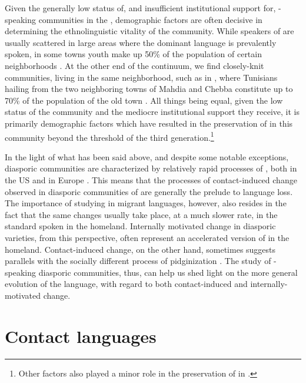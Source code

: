\documentclass[output=paper]{langsci/langscibook}
\begin{document}
Given the generally low status of, and insufficient institutional support for, -speaking communities in the , demographic factors are often decisive in determining the ethnolinguistic vitality of the community. While speakers of  are usually scattered in large areas where the dominant language is prevalently spoken, in some  towns  youth make up 50\% of the population of certain neighborhoods \citep[50]{Boumans2004}. At the other end of the continuum, we find closely-knit communities, living in the same neighborhood, such as in , where Tunisians hailing from the two neighboring towns of Mahdia and Chebba constitute up to 70\% of the population of the old town \citep[27]{Danna2017book}. All things being equal, given the low status of the  community and the mediocre institutional support they receive, it is primarily demographic factors which have resulted in the preservation of  in this community beyond the threshold of the third generation.\footnote{Other factors also played a minor role in the preservation of  in  \citep[80--81]{Danna2017book}.}

In the light of what has been said above, and despite some notable exceptions,  diasporic communities are characterized by relatively rapid processes of , both in the US \citep[29]{Daher1992} and in Europe \citep[282]{BoumansdeRuiter2002}. This means that the processes of contact-induced change observed in diasporic communities of  are generally the prelude to language loss. The importance of studying  in migrant languages, however, also resides in the fact that the same changes usually take place, at a much slower rate, in the standard spoken in the homeland. Internally motivated change in diasporic varieties, from this perspective, often represent an accelerated version of  in the homeland. Contact-induced change, on the other hand, sometimes suggests parallels with the socially different process of pidginization \citep[194--195]{GonzoSaltarelli1983}. The study of -speaking diasporic communities, thus, can help us shed light on the more general evolution of the language, with regard to both contact-induced and internally-motivated change.

\section{Contact languages}
\end{document}
